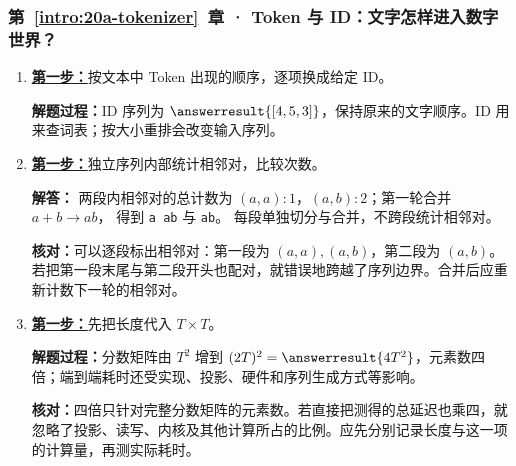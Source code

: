 \subsubsection*{第~\ref*{intro:20a-tokenizer}~章 · Token 与 ID：文字怎样进入数字世界？}
\begin{enumerate}[label={},leftmargin=4.8em,itemsep=4pt]
\item[\textbf{C-037.}] \leavevmode{}\label{solution:C-037}\label{solution:token-id-lookup}\hyperref[exercise:token-id-lookup]{\textbf{第一步：}}按文本中 Token 出现的顺序，逐项换成给定 ID。\par\nobreak
\textbf{解题过程：}ID 序列为 $\answerresult{[4,5,3]}$，保持原来的文字顺序。ID 用来查词表；按大小重排会改变输入序列。
\item[\textbf{C-038.}] \leavevmode{}\label{solution:C-038}\label{solution:bpe-pair-merge}\hyperref[exercise:bpe-pair-merge]{\textbf{第一步：}}独立序列内部统计相邻对，比较次数。\par\nobreak
\textbf{解答：} 两段内相邻对的总计数为
$(a,a):1$，$(a,b):2$；第一轮合并 $a+b\to ab$，
得到 \texttt{a ab} 与 \texttt{ab}。
每段单独切分与合并，不跨段统计相邻对。\par\textbf{核对：}可以逐段标出相邻对：第一段为 $(a,a),(a,b)$，第二段为 $(a,b)$。若把第一段末尾与第二段开头也配对，就错误地跨越了序列边界。合并后应重新计数下一轮的相邻对。
\item[\textbf{C-039.}] \leavevmode{}\label{solution:C-039}\label{solution:tokenizer-attention-cost}\hyperref[exercise:tokenizer-attention-cost]{\textbf{第一步：}}先把长度代入 $T\times T$。\par\nobreak\textbf{解题过程：}分数矩阵由 $T^2$ 增到 $(2T)^2=\answerresult{4T^2}$，元素数四倍；端到端耗时还受实现、投影、硬件和序列生成方式等影响。\par\textbf{核对：}四倍只针对完整分数矩阵的元素数。若直接把测得的总延迟也乘四，就忽略了投影、读写、内核及其他计算所占的比例。应先分别记录长度与这一项的计算量，再测实际耗时。
\end{enumerate}
